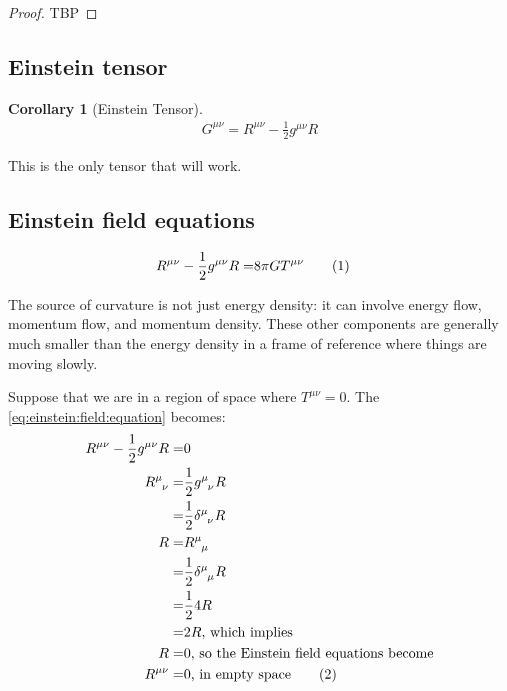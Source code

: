 \documentclass[]{article}
\newcommand\numberthis{\addtocounter{equation}{1}\tag{\theequation}}
\newtheorem{cor}[thm]{Corollary}
\begin{document}
{\begin{proof}
	TBP
\end{proof}

\subsection{Einstein tensor}

\begin{cor}[Einstein Tensor]
	\begin{align*}
		G^{\mu\nu} = R^{\mu\nu} - \frac{1}{2} g^{\mu\nu} R
	\end{align*}
\end{cor}

This is the only tensor that will work.

\subsection{Einstein field equations}

\begin{align*}
	R^{\mu\nu} - \frac{1}{2} g^{\mu\nu} R =& 8 \pi G T^{\mu\nu} \numberthis \label{eq:einstein:field:equation}
\end{align*}

The source of curvature is not just energy density: it can involve energy flow, momentum flow, and momentum density. These other components are generally much smaller than the energy density in a frame of reference where things are moving slowly.

Suppose that we are in a region of space where $T^{\mu\nu}=0$. The \ref{eq:einstein:field:equation} becomes:
\begin{align*}
	R^{\mu\nu} - \frac{1}{2} g^{\mu\nu} R =&0\\
	R\indices{^\mu_\nu} =& \frac{1}{2} g\indices{^\mu_\nu} R \\
	=& \frac{1}{2} \delta\indices{^\mu_\nu} R\\
	R =& R\indices{^\mu_\mu}\\
	=&\frac{1}{2} \delta\indices{^\mu_\mu} R\\
	=&\frac{1}{2}4 R\\
	=&2R \text{, which implies}\\
	R=&0 \text{, so the Einstein field equations become}\\
	R^{\mu\nu}=& 0 \text{, in empty space} \numberthis \label{eq:einstein:empty:space}
\end{align*}

}
\end{document}
